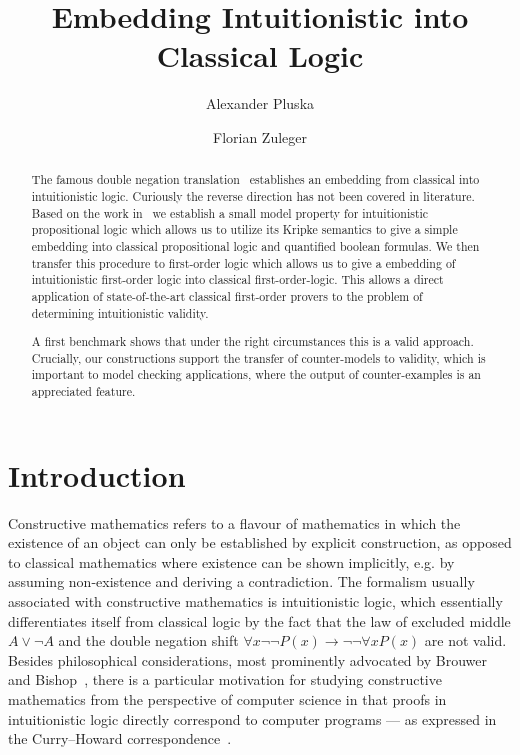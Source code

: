 \documentclass[runningheads]{llncs}
\begin{document}
	\title{Embedding Intuitionistic into Classical Logic}
	\author{Alexander Pluska \and Florian Zuleger}
	\maketitle
\begin{abstract}
The famous double negation translation~\cite{glivenko1929quelques,godel1933intuitionistischen} establishes an embedding from classical into intuitionistic logic. Curiously the reverse direction has not been covered in literature. Based on the work in~\cite{claessen2015sat} we establish a small model property for intuitionistic propositional logic which allows us to utilize its Kripke semantics to give a simple embedding into classical propositional logic and quantified boolean formulas. We then transfer this procedure to first-order logic which allows us to give a embedding of intuitionistic first-order logic into classical first-order-logic.
This allows a direct application of state-of-the-art classical first-order provers to the problem of determining intuitionistic validity.

A first benchmark shows that under the right circumstances this is a valid approach. Crucially, our constructions support the transfer of counter-models to validity, which is important to model checking applications, where the output of counter-examples is an appreciated feature.
\end{abstract}

\section{Introduction}


Constructive mathematics refers to a flavour of mathematics in which the existence of an object can only be established by explicit construction, as opposed to classical mathematics where existence can be shown implicitly, e.g. by assuming non-existence and deriving a contradiction.
The formalism usually associated with constructive mathematics is intuitionistic logic, which essentially differentiates itself from classical logic by the fact that the law of excluded middle $A\vee\neg A$ and the double negation shift $\forall x\neg\neg P(x)\to\neg\neg\forall xP(x)$ are not valid.
Besides philosophical considerations, most prominently advocated by Brouwer~\cite{brouwer1907over} and Bishop~\cite{bishop1967foundations}, there is a particular motivation for studying constructive mathematics from the perspective of computer science in that proofs in  intuitionistic logic directly correspond to computer programs --- as expressed in the Curry--Howard correspondence~\cite{howard1980formulae}.
\end{document}
